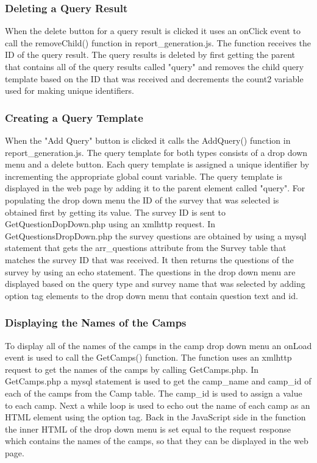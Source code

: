 \documentclass[../final.tex]{subfiles}
\begin{document}
	\subsubsection{Deleting a Query Result}
	When the delete button for a query result is clicked it uses an onClick event to call the removeChild() function in report\_generation.js. The function receives the ID of the query result. The query results is deleted by first getting the parent that contains all of the query results called "query" and removes the child query template based on the ID that was received and decrements the count2 variable used for making unique identifiers. 
	\subsubsection{Creating a Query Template} 
	When the "Add Query" button is clicked it calls the AddQuery() function in report\_generation.js. The query template for both types consists of a drop down menu and a delete button. Each query template is assigned a unique identifier by incrementing the appropriate global count variable. The query template is displayed in the web page by adding it to the parent element called "query". For populating the drop down menu the ID of the survey that was selected is obtained first by getting its value. The survey ID is sent to GetQuestionDopDown.php using an xmlhttp request. In GetQuestionsDropDown.php the survey questions are obtained by using a mysql statement that gets the arr\_questions attribute from the Survey table that matches the survey ID that was received. It then returns the questions of the survey by using an echo statement. The questions in the drop down menu are displayed based on the query type and survey name that was selected by adding option tag elements to the drop down menu that contain question text and id. 
	\subsubsection{Displaying the Names of the Camps}
	To display all of the names of the camps in the camp drop down menu an onLoad event is used to call the GetCamps() function. The function uses an xmlhttp request to get the names of the camps by calling GetCamps.php. In GetCamps.php a mysql statement is used to get the camp\_name and camp\_id of each of the camps from the Camp table. The camp\_id is used to assign a value to each camp. Next a while loop is used to echo out the name of each camp as an HTML element using the option tag. Back in the JavaScript side in the function the inner HTML of the drop down menu is set equal to the request response which contains the names of the camps, so that they can be displayed in the web page.
\end{document}
